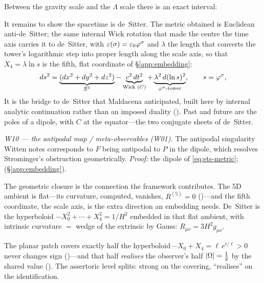 
Between the gravity scale and the $\Lambda$ scale there is an exact interval:

It remains to show the spacetime is de~Sitter. The metric obtained is Euclidean
anti-de~Sitter; the same internal Wick rotation that made the centre the time axis carries
it to de~Sitter, with $\varepsilon(\sigma)=\varepsilon_0\varphi^\sigma$ and $\lambda$ the length
that converts the tower's logarithmic step into proper length along the scale axis, so that
$X_4=\lambda\ln s$ is the fifth, flat coordinate of \S\ref{app:embedding}:
\begin{equation}\label{eq:ets-metric}
  ds^{2}=\underbrace{(dx^{2}+dy^{2}+dz^{2})}_{\mathbb{E}^{3}}
        -\underbrace{c^{2}\,dt^{2}}_{\text{Wick }(C)}
        +\underbrace{\lambda^{2}\,d(\ln s)^{2}}_{\varphi^{\sigma}\text{-tower}},
  \qquad s=\varphi^{\sigma},
\end{equation}
It is the bridge to de~Sitter that Maldacena anticipated, built here by internal analytic
continuation rather than an imposed duality (). Past and future
are the poles of a dipole, with $C$ at the equator---the two conjugate sheets of
de~Sitter.

\emph{W10 --- the antipodal map / meta-observables (W01).} The antipodal singularity
Witten notes corresponds to $F$ being antipodal to $P$ in the dipole, which resolves
Strominger's obstruction geometrically. \emph{Proof:} the dipole of \eqref{eq:ets-metric};
\cite{Witten01dS} (\S\ref{app:embedding}).

The geometric closure is the connection the framework contributes. The 5D ambient is
flat---its curvature, computed, vanishes, $R^{(5)}=0$ ()---and the
fifth coordinate, the scale axis, is the extra direction an embedding needs. De~Sitter is
the hyperboloid $-X_0^2+\cdots+X_4^2=1/H^2$ embedded in that flat ambient, with intrinsic
curvature ${}={}$ wedge of the extrinsic by Gauss: $R_{\mu\nu}=3H^2 g_{\mu\nu}$.


The planar patch covers exactly half
the hyperboloid---$X_0+X_4=\ell\,e^{t/\ell}>0$ never changes sign
()---and that half \emph{realises} the observer's half
$|\Omega|=\tfrac12$ by the shared value (). The assertoric
level splits: strong on the covering, ``realises'' on the identification.

